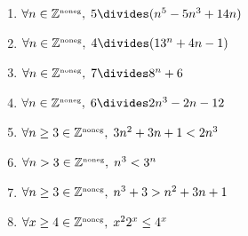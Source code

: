\begin{enumerate}

\item $\forall n \in \Naturals, \; 5 \divides (n^{5}-5n^{3}+14n)$

\wbvfill

\workbookpagebreak

\item $\forall n \in \Naturals, \; 4 \divides (13^{n}+4n-1)$

\wbvfill


\item $\forall n \in \Naturals, \; 7 \divides 8^n+6$

\wbvfill

\workbookpagebreak

\item $\forall n \in \Naturals, \; 6 \divides 2n^3 - 2n - 12$

\wbvfill


\item $\forall n \geq 3 \in {\mathbb Z}^{\mbox{\tiny noneg}}, \; 3n^2+3n+1 < 2n^3$

\wbvfill

\workbookpagebreak

\item $\forall n > 3 \in {\mathbb Z}^{\mbox{\tiny noneg}}, \; n^3 < 3^n$

\wbvfill


\item $\forall n \geq 3 \in {\mathbb Z}^{\mbox{\tiny noneg}}, \; n^{3}+3>n^{2}+3n+1$

\wbvfill

\workbookpagebreak

\item $\forall x \geq 4 \in {\mathbb Z}^{\mbox{\tiny noneg}}, \; x^22^x \leq 4^x$

\wbvfill


\end{enumerate}


